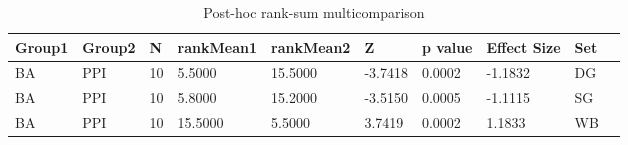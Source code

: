 \begin{table}
\centering
\begin{tabular}[0.2em]{@{}llllllllll@{}}\toprule
Group1 & Group2 & N & rankMean1 & rankMean2 & Z & p value & Effect Size & Set\\\toprule[0.2em]
BA & PPI & 10 & 5.5000 & 15.5000 & -3.7418 & 0.0002 & -1.1832 & DG \\\midrule
BA & PPI & 10 & 5.8000 & 15.2000 & -3.5150 & 0.0005 & -1.1115 & SG \\\midrule
BA & PPI & 10 & 15.5000 & 5.5000 & 3.7419 & 0.0002 & 1.1833 & WB \\\bottomrule[0.2em]
\end{tabular}
\caption{Post-hoc rank-sum multicomparison\label{tabel:null}}
\end{table}
